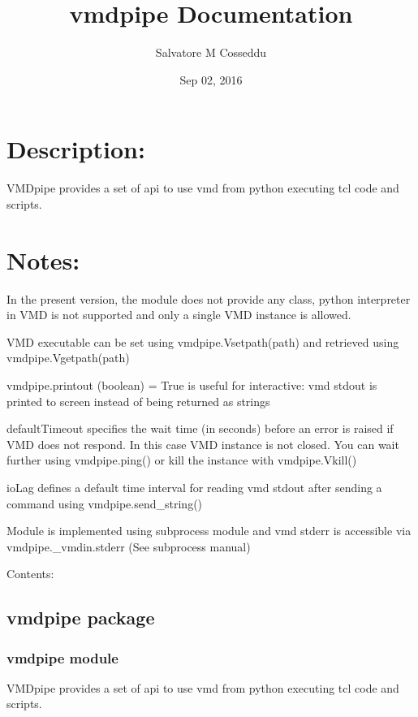 \documentclass[letterpaper,10pt,english]{sphinxmanual}
\title{vmdpipe Documentation}
\date{Sep 02, 2016}
\author{Salvatore M Cosseddu}
\begin{document}
\maketitle
\tableofcontents
{}\label{index::doc}



\chapter{Description:}
\label{index:description}\label{index:welcome-to-vmdpipe-s-documentation}
VMDpipe provides a set of api to use vmd from python executing tcl code and scripts.


\chapter{Notes:}
\label{index:notes}
In the present version, the module does not provide any class,
python interpreter in VMD is not supported and only a single VMD
instance is allowed.

VMD executable can be set using vmdpipe.Vsetpath(path) and retrieved using vmdpipe.Vgetpath(path)

vmdpipe.printout (boolean) = True is useful for interactive: vmd stdout is
printed to screen instead of being returned as strings

defaultTimeout specifies the wait time (in seconds) before an error is raised
if VMD does not respond. In this case VMD instance is not closed.
You can wait further using vmdpipe.ping() or kill the instance with vmdpipe.Vkill()

ioLag defines a default time interval for reading vmd stdout after sending a command
using vmdpipe.send\_string()

Module is implemented using subprocess module and vmd stderr is accessible via vmdpipe.\_vmdin.stderr
(See subprocess manual)

Contents:


\section{vmdpipe package}
\label{vmdpipe::doc}\label{vmdpipe:vmdpipe-package}

\subsection{vmdpipe module}
\label{vmdpipe:module-vmdpipe}\label{vmdpipe:vmdpipe-module}
VMDpipe provides a set of api to use vmd from python executing tcl code and scripts.
\end{document}
